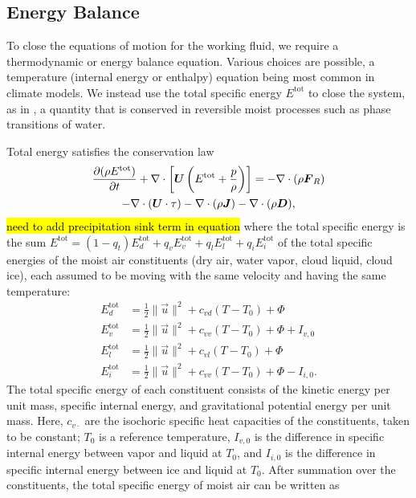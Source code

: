 \documentclass{article}
\begin{document}
\subsection{Energy Balance}

To close the equations of motion for the working fluid, we require a thermodynamic or energy balance equation. Various choices are possible, a temperature (internal energy or enthalpy) equation being most common in climate models. We instead use the total specific energy $E^\mathrm{tot}$ to close the system, as in \citet{Romps08a}, a quantity that is conserved in reversible moist processes such as phase transitions of water. 

Total energy satisfies the conservation law \citep{Romps08a}
\begin{multline}
 \frac{\partial (\rho E^{\mathrm{tot}})}{\partial t} + \nabla \cdot \left[\boldsymbol{{U}} \left(E^{\mathrm{tot}} + \frac{p}{\rho}\right) \right] 
 = -\nabla \cdot (\rho \boldsymbol{{F}}_R)   \\
  - \nabla \cdot (\boldsymbol{{U}} \cdot \tau) - \nabla \cdot (\rho \boldsymbol{{J}}) - \nabla \cdot (\rho \boldsymbol{{D}}),
 \label{eq:energy_balance}
\end{multline}
\hl{need to add precipitation sink term in equation} where the total specific energy is the sum $E^\mathrm{tot} = (1-q_t) E_d^{\mathrm{tot}}  + q_v E_v^{\mathrm{tot}} + q_l E_l^{\mathrm{tot}} + q_i E_i^{\mathrm{tot}}$ of the total specific energies of the moist air constituents (dry air, water vapor, cloud liquid, cloud ice),  each assumed to be moving with the same velocity and having the same temperature: 
\begin{align}
E_d^{\mathrm{tot}} & = \frac{1}{2} \| \vec{u} \|^2 + c_{vd} (T - T_0) + \Phi \\
E_v^{\mathrm{tot}} & = \frac{1}{2} \| \vec{u} \|^2 + c_{vv} (T - T_0) + \Phi + I_{v,0}\\
E_l^{\mathrm{tot}} & = \frac{1}{2} \| \vec{u} \|^2 + c_{vl} (T - T_0) + \Phi\\
E_i^{\mathrm{tot}} & = \frac{1}{2} \| \vec{u} \|^2 + c_{vv} (T - T_0) + \Phi - I_{i,0}.
\end{align}
The total specific energy of each constituent consists of the kinetic energy per unit mass, specific internal energy, and gravitational potential energy per unit mass. Here, $c_{v\cdot}$ are the isochoric specific heat capacities of the constituents, taken to be constant;  $T_0$ is a reference temperature, $I_{v,0}$ is the difference in specific internal energy between vapor and liquid at $T_0$, and $I_{i,0}$ is the difference in specific internal energy between ice and liquid at $T_0$. After summation over the constituents, the total specific energy of moist air can be written as
\end{document}
